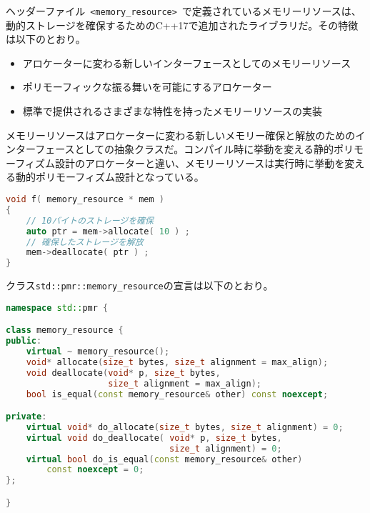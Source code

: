 %

ヘッダーファイル~\lstinline!<memory_resource>!~で定義されているメモリーリソースは、動的ストレージを確保するためのC++17で追加されたライブラリだ。その特徴は以下のとおり。

\begin{itemize}
\itemsep1pt\parskip0pt
\item
  アロケーターに変わる新しいインターフェースとしてのメモリーリソース
\item
  ポリモーフィックな振る舞いを可能にするアロケーター
\item
  標準で提供されるさまざまな特性を持ったメモリーリソースの実装
\end{itemize}

%

メモリーリソースはアロケーターに変わる新しいメモリー確保と解放のためのインターフェースとしての抽象クラスだ。コンパイル時に挙動を変える静的ポリモーフィズム設計のアロケーターと違い、メモリーリソースは実行時に挙動を変える動的ポリモーフィズム設計となっている。

\begin{lstlisting}[language=C++]
void f( memory_resource * mem )
{
    // 10バイトのストレージを確保
    auto ptr = mem->allocate( 10 ) ;
    // 確保したストレージを解放
    mem->deallocate( ptr ) ;
}
\end{lstlisting}

クラス\lstinline!std::pmr::memory_resource!の宣言は以下のとおり。

\begin{lstlisting}[language=C++]
namespace std::pmr {

class memory_resource {
public:
    virtual ~ memory_resource();
    void* allocate(size_t bytes, size_t alignment = max_align);
    void deallocate(void* p, size_t bytes,
                    size_t alignment = max_align);
    bool is_equal(const memory_resource& other) const noexcept;

private:
    virtual void* do_allocate(size_t bytes, size_t alignment) = 0;
    virtual void do_deallocate( void* p, size_t bytes,
                                size_t alignment) = 0;
    virtual bool do_is_equal(const memory_resource& other)
        const noexcept = 0;
};

}
\end{lstlisting}


